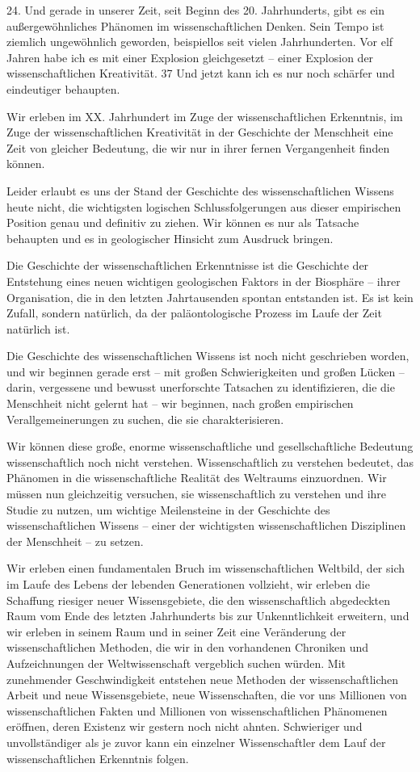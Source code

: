 \documentclass[11pt,a4paper]{book}
\begin{document}
24. Und gerade in unserer Zeit, seit Beginn des 20. Jahrhunderts, gibt es ein außergewöhnliches Phänomen im wissenschaftlichen Denken. Sein Tempo ist ziemlich ungewöhnlich geworden, beispiellos seit vielen Jahrhunderten. Vor elf Jahren habe ich es mit einer Explosion gleichgesetzt -- einer Explosion der wissenschaftlichen Kreativität. 37 Und jetzt kann ich es nur noch schärfer und eindeutiger behaupten. 

Wir erleben im XX. Jahrhundert im Zuge der wissenschaftlichen Erkenntnis, im Zuge der wissenschaftlichen Kreativität in der Geschichte der Menschheit eine Zeit von gleicher Bedeutung, die wir nur in ihrer fernen Vergangenheit finden können. 

Leider erlaubt es uns der Stand der Geschichte des wissenschaftlichen Wissens heute nicht, die wichtigsten logischen Schlussfolgerungen aus dieser empirischen Position genau und definitiv zu ziehen. Wir können es nur als Tatsache behaupten und es in geologischer Hinsicht zum Ausdruck bringen. 

Die Geschichte der wissenschaftlichen Erkenntnisse ist die Geschichte der Entstehung eines neuen wichtigen geologischen Faktors in der Biosphäre -- ihrer Organisation, die in den letzten Jahrtausenden spontan entstanden ist. Es ist kein Zufall, sondern natürlich, da der paläontologische Prozess im Laufe der Zeit natürlich ist. 

Die Geschichte des wissenschaftlichen Wissens ist noch nicht geschrieben worden, und wir beginnen gerade erst -- mit großen Schwierigkeiten und großen Lücken -- darin, vergessene und bewusst unerforschte Tatsachen zu identifizieren, die die Menschheit nicht gelernt hat -- wir beginnen, nach großen empirischen Verallgemeinerungen zu suchen, die sie charakterisieren. 

Wir können diese große, enorme wissenschaftliche und gesellschaftliche Bedeutung wissenschaftlich noch nicht verstehen. Wissenschaftlich zu verstehen bedeutet, das Phänomen in die wissenschaftliche Realität des Weltraums einzuordnen. Wir müssen nun gleichzeitig versuchen, sie wissenschaftlich zu verstehen und ihre Studie zu nutzen, um wichtige Meilensteine in der Geschichte des wissenschaftlichen Wissens -- einer der wichtigsten wissenschaftlichen Disziplinen der Menschheit -- zu setzen. 

Wir erleben einen fundamentalen Bruch im wissenschaftlichen Weltbild, der sich im Laufe des Lebens der lebenden Generationen vollzieht, wir erleben die Schaffung riesiger neuer Wissensgebiete, die den wissenschaftlich abgedeckten Raum vom Ende des letzten Jahrhunderts bis zur Unkenntlichkeit erweitern, und wir erleben in seinem Raum und in seiner Zeit eine Veränderung der wissenschaftlichen Methoden, die wir in den vorhandenen Chroniken und Aufzeichnungen der Weltwissenschaft vergeblich suchen würden. Mit zunehmender Geschwindigkeit entstehen neue Methoden der wissenschaftlichen Arbeit und neue Wissensgebiete, neue Wissenschaften, die vor uns Millionen von wissenschaftlichen Fakten und Millionen von wissenschaftlichen Phänomenen eröffnen, deren Existenz wir gestern noch nicht ahnten. Schwieriger und unvollständiger als je zuvor kann ein einzelner Wissenschaftler dem Lauf der wissenschaftlichen Erkenntnis folgen. 
\end{document}
